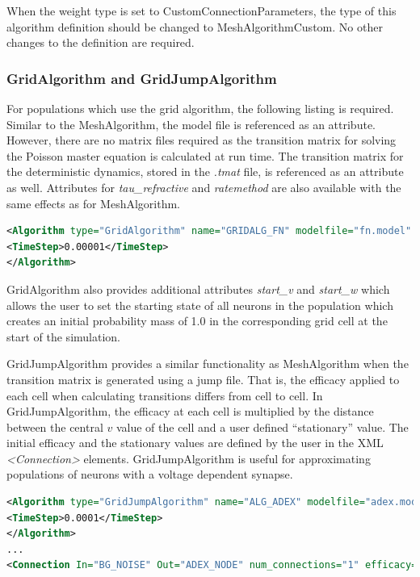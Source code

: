 \documentclass[utf8]{frontiersSCNS} %
\begin{document}
When the weight type is set to CustomConnectionParameters, the type of this algorithm definition should be changed to MeshAlgorithmCustom. No other changes to the definition are required.

\subsubsection{GridAlgorithm and GridJumpAlgorithm}

For populations which use the grid algorithm, the following listing is required. Similar to the MeshAlgorithm, the model file is referenced as an attribute. However, there are no matrix files required as the transition matrix for solving the Poisson master equation is calculated at run time. The transition matrix for the deterministic dynamics, stored in the \textit{.tmat} file, is referenced as an attribute as well. Attributes for \textit{tau\_refractive} and \textit{ratemethod} are also available with the same effects as for MeshAlgorithm. 

\begin{lstlisting}[language=xml,caption={A GridAlgorithm definition using the AvgV (membrane potential) rate method.}]
<Algorithm type="GridAlgorithm" name="GRIDALG_FN" modelfile="fn.model" tau_refractive="0.0" transformfile="fn_0_0_0_0_.tmat" start_v="-1.0" start_w="-0.3" ratemethod="AvgV">
<TimeStep>0.00001</TimeStep>
</Algorithm>
\end{lstlisting}

GridAlgorithm also provides additional attributes \textit{start\_v} and \textit{start\_w} which allows the user to set the starting state of all neurons in the population which creates an initial probability mass of 1.0 in the corresponding grid cell at the start of the simulation.

GridJumpAlgorithm provides a similar functionality as MeshAlgorithm when the transition matrix is generated using a jump file. That is, the efficacy applied to each cell when calculating transitions differs from cell to cell. In GridJumpAlgorithm, the efficacy at each cell is multiplied by the distance between the central $v$ value of the cell and a user defined ``stationary'' value. The initial efficacy and the stationary values are defined by the user in the XML \textit{\textless Connection\textgreater} elements. GridJumpAlgorithm is useful for approximating populations of neurons with a voltage dependent synapse.

\begin{lstlisting}[language=xml,caption={A GridJumpAlgorithm definition and corresponding Connection with a ``stationary'' attribute. The efficacy at each grid cell will equal the original efficacy value (-0.05) multiplied by the difference between each cell's central v value and the given stationary value (-65)}]
<Algorithm type="GridJumpAlgorithm" name="ALG_ADEX" modelfile="adex.model" tau_refractive="0.0" transformfile="adex_0_0_0_0_.tmat" start_v="-65.0" start_w="0.0">
<TimeStep>0.0001</TimeStep>
</Algorithm>
...
<Connection In="BG_NOISE" Out="ADEX_NODE" num_connections="1" efficacy="-0.05" delay="0.0" stationary="-65.0"/>
\end{lstlisting}
\end{document}
